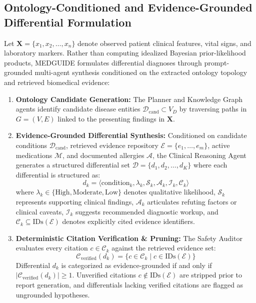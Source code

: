 \documentclass[journal,10pt,twocolumn]{IEEEtran}
\begin{document}
\subsection{Ontology-Conditioned and Evidence-Grounded Differential Formulation}
Let $\mathbf{X} = \{x_1, x_2, \dots, x_n\}$ denote observed patient clinical features, vital signs, and laboratory markers. Rather than computing idealized Bayesian prior-likelihood products, MEDGUIDE formulates differential diagnoses through prompt-grounded multi-agent synthesis conditioned on the extracted ontology topology and retrieved biomedical evidence:
\begin{enumerate}
    \item \textbf{Ontology Candidate Generation:} The Planner and Knowledge Graph agents identify candidate disease entities $\mathcal{D}_{\text{cand}} \subset V_D$ by traversing paths in $G=(V,E)$ linked to the presenting findings in $\mathbf{X}$.
    \item \textbf{Evidence-Grounded Differential Synthesis:} Conditioned on candidate conditions $\mathcal{D}_{\text{cand}}$, retrieved evidence repository $\mathcal{E} = \{e_1, \dots, e_m\}$, active medications $\mathcal{M}$, and documented allergies $\mathcal{A}$, the Clinical Reasoning Agent generates a structured differential set $\mathcal{D} = \{d_1, d_2, \dots, d_K\}$ where each differential is structured as:
    \begin{equation}
    d_k = \langle \text{condition}_k, \lambda_k, \mathcal{S}_k, \mathcal{A}_k, \mathcal{I}_k, \mathcal{C}_k \rangle
    \end{equation}
    where $\lambda_k \in \{\text{High}, \text{Moderate}, \text{Low}\}$ denotes qualitative likelihood, $\mathcal{S}_k$ represents supporting clinical findings, $\mathcal{A}_k$ articulates refuting factors or clinical caveats, $\mathcal{I}_k$ suggests recommended diagnostic workup, and $\mathcal{C}_k \subseteq \text{IDs}(\mathcal{E})$ denotes explicitly cited evidence identifiers.
    \item \textbf{Deterministic Citation Verification \& Pruning:} The Safety Auditor evaluates every citation $c \in \mathcal{C}_k$ against the retrieved evidence set:
    \begin{equation}
    \mathcal{C}_{\text{verified}}(d_k) = \{ c \in \mathcal{C}_k \mid c \in \text{IDs}(\mathcal{E}) \}
    \end{equation}
    Differential $d_k$ is categorized as evidence-grounded if and only if $|\mathcal{C}_{\text{verified}}(d_k)| \ge 1$. Unverified citations $c \notin \text{IDs}(\mathcal{E})$ are stripped prior to report generation, and differentials lacking verified citations are flagged as ungrounded hypotheses.
\end{enumerate}
\end{document}
